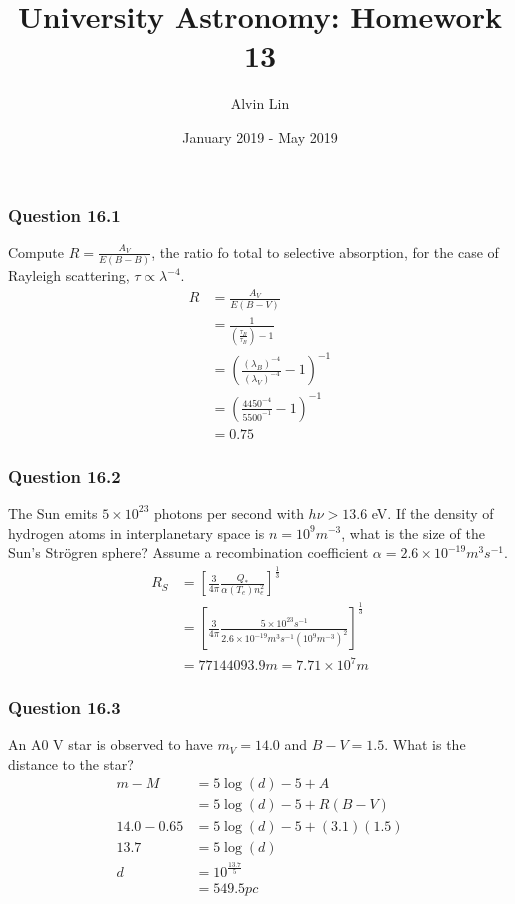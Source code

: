 \documentclass{math}
\title{University Astronomy: Homework 13}
\author{Alvin Lin}
\date{January 2019 - May 2019}
\begin{document}
\maketitle

\subsubsection*{Question 16.1}
Compute \( R = \frac{A_V}{E(B-B)} \), the ratio fo total to selective
absorption, for the case of Rayleigh scattering, \( \tau\propto\lambda^{-4} \).
\begin{align*}
  R &= \frac{A_V}{E(B-V)} \\
  &= \frac{1}{(\frac{\tau_B}{\tau_B})-1} \\
  &= \left(\frac{(\lambda_B)^{-4}}{(\lambda_V)^{-4}}-1\right)^{-1} \\
  &= \left(\frac{4450^{-4}}{5500^{-1}}-1\right)^{-1} \\
  &= 0.75
\end{align*}

\subsubsection*{Question 16.2}
The Sun emits \( 5\times10^{23} \) photons per second with \( h\nu > 13.6 \) eV.
If the density of hydrogen atoms in interplanetary space is \( n = 10^{9}m^{-3}
\), what is the size of the Sun's Str\"{o}gren sphere? Assume a recombination
coefficient \( \alpha = 2.6\times10^{-19}m^3s^{-1} \).
\begin{align*}
  R_S &= \left[\frac{3}{4\pi}\frac{Q_*}{\alpha(T_e)n_e^2}\right]^{
    \frac{1}{3}} \\
  &= \left[\frac{3}{4\pi}\frac{5\times10^{23}s^{-1}}
    {2.6\times10^{-19}m^3s^{-1}(10^{9}m^{-3})^2}\right]^{\frac{1}{3}} \\
  &= 77144093.9m = 7.71\times10^{7}m
\end{align*}

\subsubsection*{Question 16.3}
An A0 V star is observed to have \( m_V = 14.0 \) and \( B-V = 1.5 \). What is
the distance to the star?
\begin{align*}
  m-M &= 5\log(d)-5+A \\
  &= 5\log(d)-5+R(B-V) \\
  14.0-0.65 &= 5\log(d)-5+(3.1)(1.5) \\
  13.7 &= 5\log(d) \\
  d &= 10^{\frac{13.7}{5}} \\
  &= 549.5pc
\end{align*}
\end{document}

